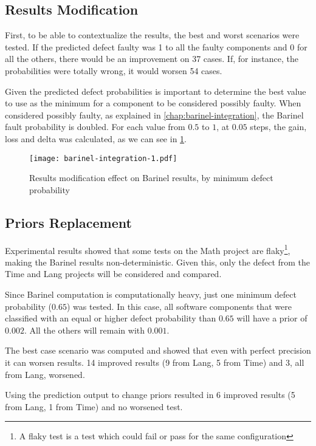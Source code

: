 \subsection{Results Modification}

First, to be able to contextualize the results, the best and worst scenarios were tested. If the predicted defect faulty was 1 to all the faulty components and 0 for all the others, there would be an improvement on 37 cases. If, for instance, the probabilities were totally wrong, it would worsen 54 cases.

Given the predicted defect probabilities is important to determine the best value to use as the minimum for a component to be considered possibly faulty. When considered possibly faulty, as explained in \ref{chap:barinel-integration}, the Barinel fault probability is doubled. For each value from $0.5$ to $1$, at $0.05$ steps, the gain, loss and delta was calculated, as we can see in \ref{fig:results-modification}.

\begin{figure}[ht]
  \begin{center}
    \leavevmode
    \texttt{[image: barinel-integration-1.pdf]}
    \caption{Results modification effect on Barinel results, by minimum defect probability}
    \label{fig:results-modification}
  \end{center}
\end{figure}

\subsection{Priors Replacement}

Experimental results showed that some tests on the Math project are flaky\footnote{A flaky test is a test which could fail or pass for the same configuration}, making the Barinel results non-deterministic. Given this, only the defect from the Time and Lang projects will be considered and compared.

Since Barinel computation is computationally heavy, just one minimum defect probability ($0.65$) was tested. In this case, all software components that were classified with an equal or higher defect probability than $0.65$ will have a prior of $0.002$. All the others will remain with $0.001$.

The best case scenario was computed and showed that even with perfect precision it can worsen results. 14 improved results (9 from Lang, 5 from Time) and 3, all from Lang, worsened.

Using the prediction output to change priors resulted in 6 improved results (5 from Lang, 1 from Time) and no worsened test.
